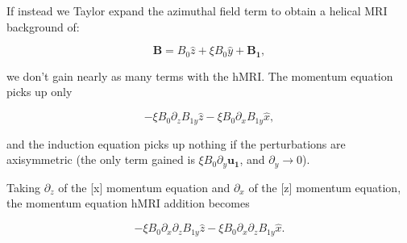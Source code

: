 \documentclass[letterpaper,12pt]{article}
\newcommand{\beq}{\begin{equation}}
\newcommand{\eeq}{\end{equation}}
\begin{document}
If instead we Taylor expand the azimuthal field term to obtain a helical MRI background of:

\beq
\mathbf{B} = B_0 \hat{z} + \xi B_0 \hat{y} + \mathbf{B_1},
\eeq

we don't gain nearly as many terms with the hMRI. The momentum equation picks up only 

\beq
-\xi B_0 \partial_z B_{1y} \hat{z} - \xi B_0 \partial_x B_{1y} \hat{x},
\eeq

and the induction equation picks up nothing if the perturbations are axisymmetric (the only term gained is $\xi B_0 \partial_y \mathbf{u_1}$, and $\partial_y \rightarrow 0$). 

Taking $\partial_z$ of the [x] momentum equation and $\partial_x$ of the [z] momentum equation, the momentum equation hMRI addition becomes

\beq
-\xi B_0 \partial_x \partial_z B_{1y} \hat{z} - \xi B_0 \partial_x \partial_z B_{1y} \hat{x}.
\eeq



\end{document}
